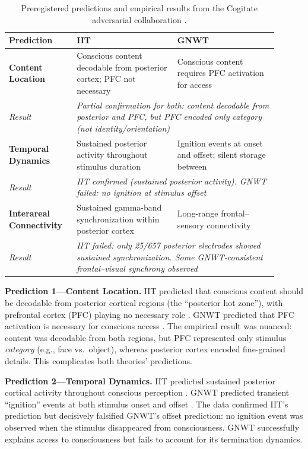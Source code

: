 \begin{table}[htbp]
\centering
\caption{Preregistered predictions and empirical results from the Cogitate adversarial
collaboration \cite{ferrante2025adversarial}.}
\label{tab:cogitate}
\begin{tabular}{p{0.22\linewidth}p{0.34\linewidth}p{0.34\linewidth}}
\toprule
\textbf{Prediction} & \textbf{IIT} & \textbf{GNWT} \\
\midrule
\textbf{Content Location} & Conscious content decodable from posterior cortex; PFC not
necessary & Conscious content requires PFC activation for access \\
\textit{Result} & \multicolumn{2}{p{0.68\linewidth}}{\textit{Partial confirmation for both:
content decodable from posterior and PFC, but PFC encoded only category (not identity/orientation)}} \\
\midrule
\textbf{Temporal Dynamics} & Sustained posterior activity throughout stimulus duration &
Ignition events at onset and offset; silent storage between \\
\textit{Result} & \multicolumn{2}{p{0.68\linewidth}}{\textit{IIT confirmed (sustained
posterior activity). GNWT failed: no ignition at stimulus offset}} \\
\midrule
\textbf{Interareal Connectivity} & Sustained gamma-band synchronization within posterior
cortex & Long-range frontal--sensory connectivity \\
\textit{Result} & \multicolumn{2}{p{0.68\linewidth}}{\textit{IIT failed: only 25/657
posterior electrodes showed sustained synchronization. Some GNWT-consistent
frontal--visual synchrony observed}} \\
\bottomrule
\end{tabular}
\end{table}

\textbf{Prediction 1---Content Location.} IIT predicted that conscious content should be
decodable from posterior cortical regions (the ``posterior hot zone''), with prefrontal
cortex (PFC) playing no necessary role \cite{tononi2016integrated}. GNWT predicted that PFC
activation is necessary for conscious access \cite{dehaene2014toward}. The empirical result
was nuanced: content was decodable from both regions, but PFC represented only stimulus
\emph{category} (e.g., face vs.\ object), whereas posterior cortex encoded fine-grained
details. This complicates both theories' predictions.

\textbf{Prediction 2---Temporal Dynamics.} IIT predicted sustained posterior cortical
activity throughout conscious perception \cite{tononi2004information}. GNWT predicted
transient ``ignition'' events at both stimulus onset and offset \cite{dehaene2014toward}.
The data confirmed IIT's prediction but decisively falsified GNWT's offset prediction: no
ignition event was observed when the stimulus disappeared from consciousness. GNWT
successfully explains access to consciousness but fails to account for its termination
dynamics.

